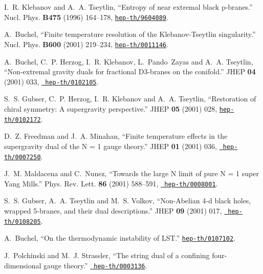 \documentclass[a4paper,11pt]{article}
\begin{document}
\begin{thebibliography}{10}
I.~R. Klebanov and A.~A. Tseytlin, ``Entropy of near extremal black p-branes.''
  Nucl. Phys. {\bf B475} (1996) 164--178,
  \href{http://xxx.lanl.gov/abs/hep-th/9604089}{{\tt hep-th/9604089}}.

A.~Buchel, ``Finite temperature resolution of the Klebanov-Tseytlin
  singularity.'' Nucl. Phys. {\bf B600} (2001) 219--234,
  \href{http://xxx.lanl.gov/abs/hep-th/0011146}{{\tt hep-th/0011146}}.

A.~Buchel, C.~P. Herzog, I.~R. Klebanov, L.~Pando~Zayas and A.~A. Tseytlin,
  ``Non-extremal gravity duals for fractional D3-branes on the conifold.'' JHEP
  {\bf 04} (2001) 033, \href{http://xxx.lanl.gov/abs/hep-th/0102105}{{\tt
  hep-th/0102105}}. %

S.~S. Gubser, C.~P. Herzog, I.~R. Klebanov and A.~A. Tseytlin, ``Restoration of
  chiral symmetry: A supergravity perspective.'' JHEP {\bf 05} (2001) 028,
  \href{http://xxx.lanl.gov/abs/hep-th/0102172}{{\tt hep-th/0102172}}.

D.~Z. Freedman and J.~A. Minahan, ``Finite temperature effects in the
  supergravity dual of the {N = 1\myHighlight{${}^\star$}\coordHE{}} gauge theory.'' JHEP {\bf 01}
  (2001) 036,
  \href{http://xxx.lanl.gov/abs/http://arXiv.org/abs/hep-th/0007250}{{\tt
  hep-th/0007250}}. %

J.~M. Maldacena and C.~Nunez, ``Towards the large N limit of pure N = 1 super
  Yang Mills.'' Phys. Rev. Lett. {\bf 86} (2001) 588--591,
  \href{http://xxx.lanl.gov/abs/http://arXiv.org/abs/hep-th/0008001}{{\tt
  hep-th/0008001}}. %

S.~S. Gubser, A.~A. Tseytlin and M.~S. Volkov, ``Non-Abelian 4-d black holes,
  wrapped 5-branes, and their dual descriptions.'' JHEP {\bf 09} (2001) 017,
  \href{http://xxx.lanl.gov/abs/http://arXiv.org/abs/hep-th/0108205}{{\tt
  hep-th/0108205}}. %

A.~Buchel, ``On the thermodynamic instability of {LST}.''
  \href{http://xxx.lanl.gov/abs/hep-th/0107102}{{\tt hep-th/0107102}}.

J.~Polchinski and M.~J. Strassler, ``The string dual of a confining
  four-dimensional gauge theory.''
  \href{http://xxx.lanl.gov/abs/http://arXiv.org/abs/hep-th/0003136}{{\tt
  hep-th/0003136}}. %


\end{thebibliography}
\end{document}
